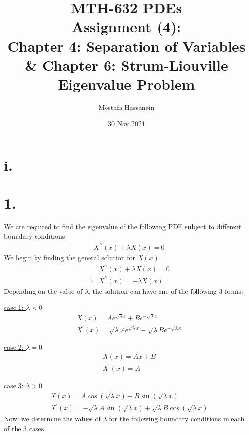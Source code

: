 \documentclass{article}
\author{Mostafa Hassanein}
\title{
  MTH-632 PDEs \\
  Assignment (4): \\ Chapter 4: Separation of Variables \\ \& Chapter 6: Strum-Liouville Eigenvalue Problem}
\date{30 Nov 2024}
\begin{document}
\maketitle
\newpage

\section*{i.}
\section*{1.}
We are required to find the eigenvalue of the following PDE subject to different boundary conditions:
\begin{align*}
  &X^{\prime\prime}(x) + \lambda X(x) = 0
\end{align*}
We begin by finding the general solution for $X(x)$:
\begin{align*}
  &X^{\prime\prime}(x) + \lambda X(x) = 0 \\
  \implies& X^{\prime\prime}(x) = - \lambda X(x)
\end{align*}
Depending on the value of $\lambda$, the solution can have one of the following 3 forms:

\underline{case 1: $\lambda < 0$}
\begin{align*}
  &X(x) = A e^{\sqrt{\lambda} x} + B e^{-\sqrt{\lambda} x} \\
  & X^{\prime}(x) = \sqrt{\lambda} A e^{\sqrt{\lambda} x} - \sqrt{\lambda} B e^{-\sqrt{\lambda} x}
\end{align*}

\underline{case 2: $\lambda = 0$}
\begin{align*}
  &X(x) = Ax + B \\
  &X^{\prime}(x) = A
\end{align*}

\underline{case 3: $\lambda > 0$}
\begin{align*}
  &X(x) = A \cos(\sqrt{\lambda} x) + 
  B \sin(\sqrt{\lambda} x) \\
  &X^{\prime}(x) = -\sqrt{\lambda} A \sin(\sqrt{\lambda} x) + 
  \sqrt{\lambda} B\cos(\sqrt{\lambda} x)
\end{align*}
Now, we determine the values of $\lambda$ for the following boundary conditions in each of the 3 cases.

\end{document}
